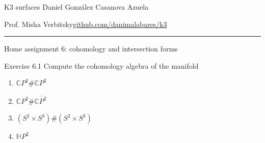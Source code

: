 

\usepackage[style=authortitle-terse,backend=bibtex]{biblatex}


\setcounter{secnumdepth}{2}



\begin{minipage}{\textwidth}
	\begin{minipage}{1\textwidth}
		K3 surfaces \hfill Daniel González Casanova Azuela
		
		{\small Prof. Misha Verbitsky\hfill\href{https://github.com/danimalabares/k3}{github.com/danimalabares/k3}}
	\end{minipage}
\end{minipage}\vspace{.2cm}\hrule

\vspace{10pt}
{\huge Home assignment 6: cohomology and intersection forms}

\begin{thing1}{Exercise 6.1}\leavevmode
	Compute the cohomology algebra of the manifold
	\begin{enumerate}[label=\alph*.]
		\item $\mathbb{C}P^{2}\#\mathbb{C}P^{2}$
		\item $\mathbb{C}P^{2}\#\overline{\mathbb{C}P^{2}}$ 
		\item $(S^2\times S^3)\#(S^2\times S^3)$
		\item $\mathbb{H}P^2$
	\end{enumerate}
\end{thing1}

